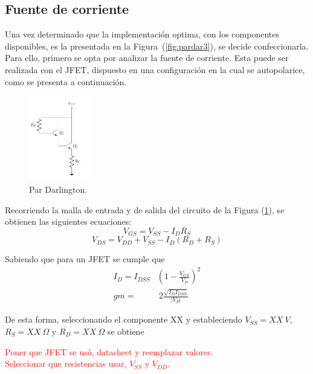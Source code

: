 \subsection{Fuente de corriente}
\label{subsec:fdei}
Una vez determinado que la implementación optima, con los componentes disponibles, es la presentada en la Figura~(\ref{fig:pardar3}), se decide confeccionarla. Para ello, primero se opta por analizar la fuente de corriente. Esta puede ser realizada con el JFET, dispuesto en una configuración en la cual se autopolarice, como se presenta a continuación.
\begin{figure}[H]
\centering
	\includegraphics[width=0.25\textwidth, page=4]{Imagenes/ParDarlington.pdf}
	\caption{Par Darlington.}
	\label{fig:fuentei}
\end{figure}

Recorriendo la malla de entrada y de salida del circuito de la Figura (\ref{fig:fuentei}), se obtienen las siguientes ecuaciones:
\begin{equation}
	V_{GS} = V_{SS} - I_{D} R_{S}
\end{equation}
\begin{equation}
	V_{DS} = V_{DD} + V_{SS} - I_{D} \left( R_{D} + R_{S} \right)
\end{equation}

Sabiendo que para un JFET se cumple que
\begin{equation}
\begin{split}
	I_D = I_{DSS} & \left( 1 - \frac{V_{GS}}{V_P} \right)^2 \\
	gm = & \ 2\frac{\sqrt{I_D I_{DSS}}}{|V_P|}
\end{split}
\end{equation}

De esta forma, seleccionando el componente XX %
y estableciendo $V_{SS} = XX \ V$, $R_S = XX \ \Omega$ y $R_D = XX \ \Omega$ se obtiene
\begin{center}
	\LARGE{\textcolor{red}{Poner que JFET se usó, datasheet y reemplazar valores.}} \\
	\LARGE{\textcolor{red}{Seleccionar que resistencias usar, $V_{SS}$ y $V_{DD}$.}}
\end{center}

